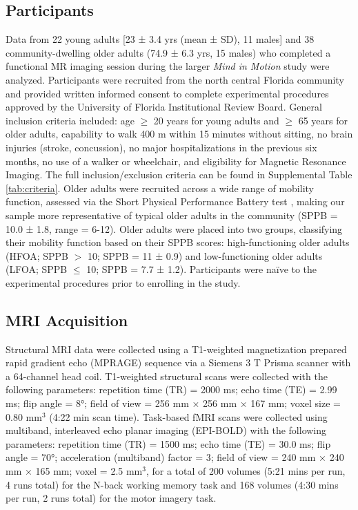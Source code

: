 \documentclass[a4paper,fleqn]{cas-sc}
\begin{document}
\subsection{Participants}
Data from 22 young adults [23 ± 3.4 yrs (mean ± SD), 11 males] and 38 community-dwelling older adults (74.9 ± 6.3 yrs, 15 males) who completed a functional MR imaging session during the larger \textit{Mind in Motion} study \citep{Clark2020} were analyzed. Participants were recruited from the north central Florida community and provided written informed consent to complete experimental procedures approved by the University of Florida Institutional Review Board. General inclusion criteria included: age $\geq$ 20 years for young adults and $\geq$ 65 years for older adults, capability to walk 400 m within 15 minutes without sitting, no brain injuries (stroke, concussion), no major hospitalizations in the previous six months, no use of a walker or wheelchair, and eligibility for Magnetic Resonance Imaging. The full inclusion/exclusion criteria can be found in Supplemental Table \ref{tab:criteria}. Older adults were recruited across a wide range of mobility function, assessed via the Short Physical Performance Battery test \citep[SPPB;][]{Guralnik1994}, making our sample more representative of typical older adults in the community (SPPB = 10.0 ± 1.8, range = 6-12). Older adults were placed into two groups, classifying their mobility function based on their SPPB scores: high-functioning older adults (HFOA; SPPB $>$ 10; SPPB = 11 ± 0.9) and low-functioning older adults (LFOA; SPPB $\leq$ 10; SPPB = 7.7 ± 1.2). Participants were naïve to the experimental procedures prior to enrolling in the study.

\subsection{MRI Acquisition}
Structural MRI data were collected using a T1-weighted magnetization prepared rapid gradient echo (MPRAGE) sequence via a Siemens 3 T Prisma scanner with a 64-channel head coil. T1-weighted structural scans were collected with the following parameters: repetition time (TR) = 2000 ms; echo time (TE) = 2.99 ms; flip angle = 8°; field of view = 256 mm × 256 mm × 167 mm; voxel size = 0.80 mm$^3$ (4:22 min scan time). Task-based fMRI scans were collected using multiband, interleaved echo planar imaging (EPI-BOLD) with the following parameters: repetition time (TR) = 1500 ms; echo time (TE) = 30.0 ms; flip angle = 70°; acceleration (multiband) factor = 3; field of view = 240 mm × 240 mm × 165 mm; voxel = 2.5 mm$^3$, for a total of 200 volumes (5:21 mins per run, 4 runs total) for the N-back working memory task and 168 volumes (4:30 mins per run, 2 runs total) for the motor imagery task.
\end{document}
